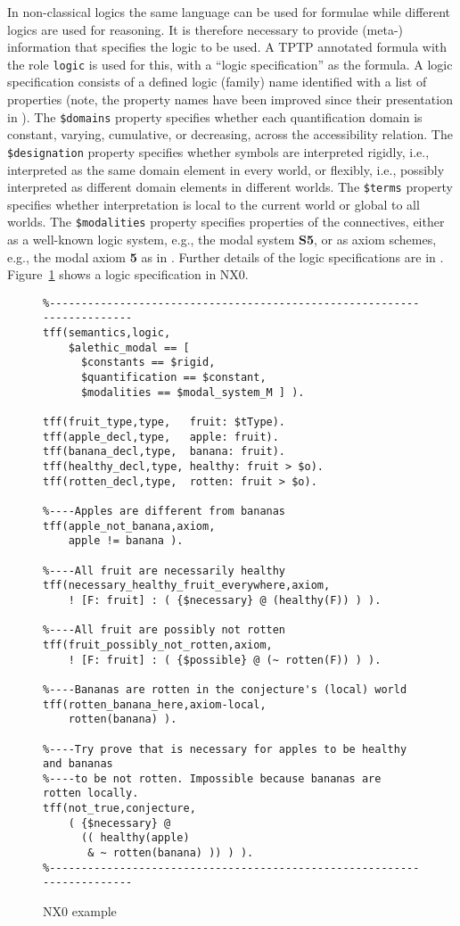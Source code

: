\documentclass[runningheads]{llncs}
\begin{document}
In non-classical logics the same language can be used for formulae while different logics are 
used for reasoning.
It is therefore necessary to provide \mbox{(meta-)} information that specifies the
logic to be used.
A TPTP annotated formula with the role \texttt{logic} is used for this, with a ``logic 
specification'' as the formula.
A logic specification consists of a defined logic (family) name identified with a list of 
properties (note, the property names have been improved since their presentation in \cite{SF+22}).
The {\tt \$domains} property specifies whether each quantification domain is constant, varying,
cumulative, or decreasing, across the accessibility relation.
The {\tt \$designation} property specifies whether symbols are interpreted rigidly, i.e., 
interpreted as the same domain element in every world, or flexibly, i.e., possibly interpreted 
as different domain elements in different worlds. 
The {\tt \$terms} property specifies whether interpretation is local to the current world or
global to all worlds.
The {\tt \$modalities} property specifies properties of the connectives, either as a well-known 
logic system, e.g., the modal system {\bf S5}, or as axiom schemes, e.g., the modal axiom {\bf 5} 
as in \cite{Gar18}.
Further details of the logic specifications are in \cite{SF+22}.
Figure~\ref{NX0Example} shows a logic specification in NX0.

\begin{figure}[h!]
\small
{}
\begin{verbatim}
%------------------------------------------------------------------------
tff(semantics,logic,
    $alethic_modal == [
      $constants == $rigid,
      $quantification == $constant,
      $modalities == $modal_system_M ] ).

tff(fruit_type,type,   fruit: $tType).
tff(apple_decl,type,   apple: fruit).
tff(banana_decl,type,  banana: fruit).
tff(healthy_decl,type, healthy: fruit > $o).
tff(rotten_decl,type,  rotten: fruit > $o).

%----Apples are different from bananas
tff(apple_not_banana,axiom,
    apple != banana ).

%----All fruit are necessarily healthy
tff(necessary_healthy_fruit_everywhere,axiom,
    ! [F: fruit] : ( {$necessary} @ (healthy(F)) ) ).

%----All fruit are possibly not rotten
tff(fruit_possibly_not_rotten,axiom,
    ! [F: fruit] : ( {$possible} @ (~ rotten(F)) ) ).

%----Bananas are rotten in the conjecture's (local) world
tff(rotten_banana_here,axiom-local,
    rotten(banana) ).

%----Try prove that is necessary for apples to be healthy and bananas 
%----to be not rotten. Impossible because bananas are rotten locally.
tff(not_true,conjecture,
    ( {$necessary} @
      (( healthy(apple)
       & ~ rotten(banana) )) ) ).
%------------------------------------------------------------------------
\end{verbatim}
\caption{NX0 example}
\label{NX0Example}
\end{figure}
\end{document}
